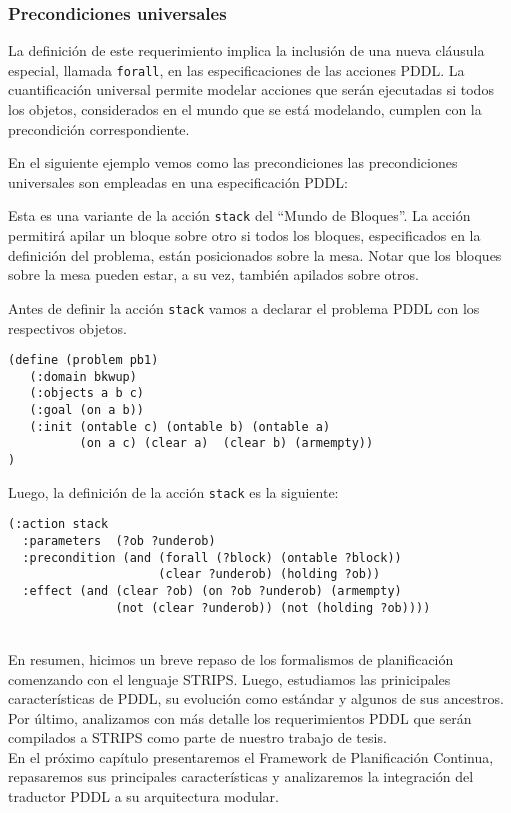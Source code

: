 	\subsubsection{Precondiciones universales} 
	
	La definici\'on de este requerimiento implica 
	la inclusi\'on de una nueva cl\'ausula especial,
	llamada \texttt{forall}, en las especificaciones de las acciones PDDL. 
	La cuantificaci\'on universal permite modelar acciones que ser\'an ejecutadas 
	si todos los objetos, considerados en el mundo que se est\'a modelando, 
	cumplen con la precondici\'on correspondiente. 

	En el siguiente ejemplo vemos como las precondiciones 
	las precondiciones universales son empleadas en 
	una especificaci\'on PDDL:
	
	\begin{ejemplo}%

	Esta es una variante de la acci\'on \texttt{stack} del 
        ``Mundo de Bloques''. La acci\'on permitir\'a apilar un
        bloque sobre otro si todos los bloques, especificados en la
        definici\'on del pro\-ble\-ma, est\'an posicionados sobre
        la mesa. Notar que los bloques sobre la mesa pueden estar, a
        su vez, tambi\'en apilados sobre otros.
	
	Antes de definir la acci\'on \texttt{stack} vamos a 
	declarar el problema PDDL con los respectivos objetos.
	
	\begin{verbatim}
(define (problem pb1)
   (:domain bkwup)
   (:objects a b c)
   (:goal (on a b))
   (:init (ontable c) (ontable b) (ontable a) 
          (on a c) (clear a)  (clear b) (armempty))
)
	\end{verbatim}
	
	Luego, la definici\'on de la acci\'on \texttt{stack} 
	es la siguiente:
	
	\begin{verbatim}
(:action stack
  :parameters  (?ob ?underob)
  :precondition (and (forall (?block) (ontable ?block))
                     (clear ?underob) (holding ?ob))
  :effect (and (clear ?ob) (on ?ob ?underob) (armempty)
               (not (clear ?underob)) (not (holding ?ob))))
	\end{verbatim}
	\end{ejemplo}
\ \\
En resumen, hicimos un breve repaso de los formalismos de
planificaci\'on comenzando con el lenguaje STRIPS. Luego, estudiamos
las prinicipales caracter\'isticas de PDDL, su evoluci\'on como
est\'andar y algunos de sus ancestros. Por \'ultimo,
analizamos con m\'as detalle los requerimientos PDDL que ser\'an
compilados a STRIPS como parte de nuestro trabajo de tesis.
\ \\

En el pr\'oximo cap\'itulo presentaremos el Framework de
Planificaci\'on Continua, repasaremos sus principales
caracter\'isticas y analizaremos la integraci\'on del traductor PDDL a
su arquitectura modular.

























